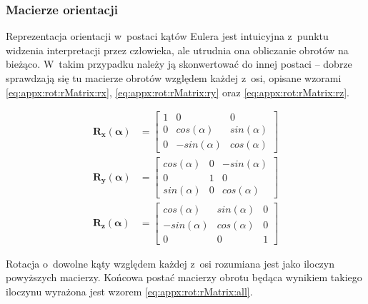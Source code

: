 \subsubsection*{Macierze orientacji}
Reprezentacja orientacji w~postaci kątów Eulera jest intuicyjna z~punktu widzenia interpretacji przez człowieka, ale utrudnia ona obliczanie obrotów na bieżąco. W~takim przypadku należy ją skonwertować do innej postaci -- dobrze sprawdzają się tu macierze obrotów względem każdej z~osi, opisane wzorami \ref{eq:appx:rot:rMatrix:rx}, \ref{eq:appx:rot:rMatrix:ry} oraz \ref{eq:appx:rot:rMatrix:rz}.
																													
\begin{subequations}
	\begin{align}
		\mathbf{R_x(\alpha)} & = 
		\begin{bmatrix}
		1            & 0            & 0            \\
		0            & cos(\alpha)  & sin(\alpha)  \\
		0            & -sin(\alpha) & cos(\alpha)  
		\end{bmatrix} 
		\label{eq:appx:rot:rMatrix:rx} \\				
		\mathbf{R_y(\alpha)} & = 
		\begin{bmatrix}
		cos(\alpha)  & 0            & -sin(\alpha) \\
		0            & 1            & 0            \\
		sin(\alpha)  & 0            & cos(\alpha)  
		\end{bmatrix} 
		\label{eq:appx:rot:rMatrix:ry} \\				
		\mathbf{R_z(\alpha)} & = 
		\begin{bmatrix}
		cos(\alpha)  & sin(\alpha)  & 0            \\
		-sin(\alpha) & cos(\alpha)  & 0            \\
		0            & 0            & 1            
		\end{bmatrix} 
		\label{eq:appx:rot:rMatrix:rz}
	\end{align}
\end{subequations}
																													
Rotacja o~dowolne kąty względem każdej z~osi rozumiana jest jako iloczyn powyższych macierzy. Końcowa postać macierzy obrotu będąca wynikiem takiego iloczynu wyrażona jest wzorem \ref{eq:appx:rot:rMatrix:all}.
																													
